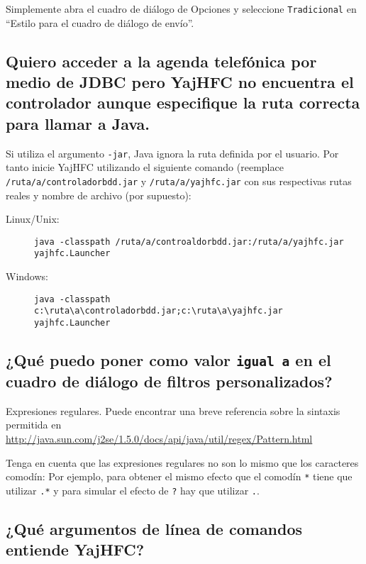 \documentclass[a4paper,10pt]{scrartcl}
\begin{document}
Simplemente abra el cuadro de diálogo de Opciones y seleccione \texttt{Tradicional} en ``Estilo para el cuadro de diálogo de envío''.

\subsection{Quiero acceder a la agenda telefónica por medio de JDBC pero YajHFC no encuentra el controlador aunque especifique la ruta correcta para llamar a Java.}

Si utiliza el argumento \texttt{-jar}, Java ignora la ruta definida por el usuario.
Por tanto inicie YajHFC utilizando el siguiente comando (reemplace \texttt{/ruta/a/controladorbdd.jar} y \texttt{/ruta/a/yajhfc.jar} con sus respectivas rutas reales y nombre de archivo (por supuesto):
\begin{description}
\item [Linux/Unix:] \verb#java -classpath /ruta/a/controaldorbdd.jar:/ruta/a/yajhfc.jar yajhfc.Launcher#
\item [Windows:] \verb#java -classpath c:\ruta\a\controladorbdd.jar;c:\ruta\a\yajhfc.jar yajhfc.Launcher#
\end{description}

\subsection{¿Qué puedo poner como valor \texttt{igual a} en el cuadro de diálogo de filtros personalizados? }

Expresiones regulares. Puede encontrar una breve referencia sobre la sintaxis permitida en
\url{http://java.sun.com/j2se/1.5.0/docs/api/java/util/regex/Pattern.html}

Tenga en cuenta que las expresiones regulares no son lo mismo que los caracteres comodín:
Por ejemplo, para obtener el mismo efecto que el comodín \verb.*. tiene que utilizar \verb#.*#
y para simular el efecto de \verb#?# hay que utilizar \verb#.#.

\subsection{¿Qué argumentos de línea de comandos entiende YajHFC?}
\end{document}
